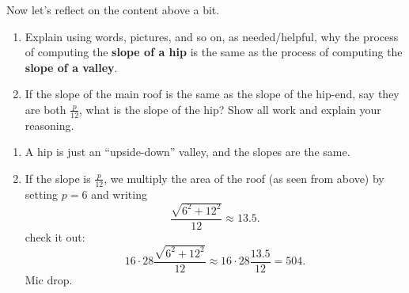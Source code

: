 \documentclass[hints,nooutcomes,noauthor,handout]{ximera}
\begin{document}
\begin{question}
  Now let's reflect on the content above a bit.
  \begin{enumerate}
    \item Explain using words, pictures, and so on, as needed/helpful,
      why the process of computing the \textbf{slope of a hip} is the same as the process of computing the
      \textbf{slope of a valley}.
    \item If the slope of the main roof is the same as the slope of the
    hip-end, say they are both $\frac{p}{12}$, what is the slope of
    the hip? Show all work and explain your reasoning.
  \end{enumerate}
  \begin{freeResponse}
    \begin{enumerate}
  \item A hip is just an ``upside-down'' valley, and the slopes are
    the same.
  \item If the slope is $\frac{p}{12}$, we multiply the area of the
    roof (as seen from above) by setting $p = 6$ and writing
    \[
    \frac{\sqrt{6^2+12^2}}{12} \approx 13.5.
    \]
    check it out:
    \[
    16\cdot 28 \frac{\sqrt{6^2+12^2}}{12} \approx 16\cdot 28 \frac{13.5}{12} = 504.
    \]
    Mic drop.
    \end{enumerate}
  \end{freeResponse}
\end{question}
\end{document}
